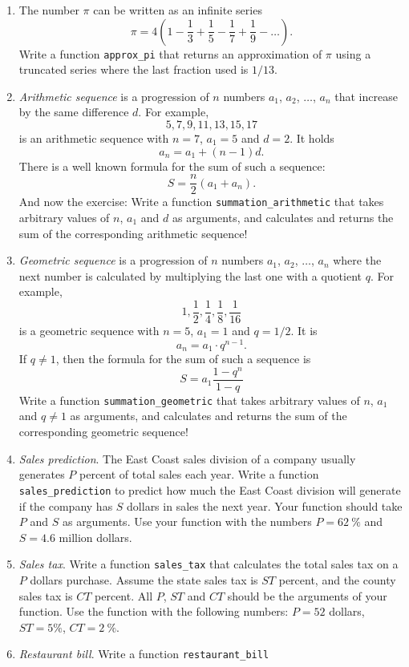 \begin{enumerate}
\item The number $\pi$ can be written as an infinite series 
$$
\pi = 4\left(1 - \frac{1}{3} + \frac{1}{5} - \frac{1}{7} + \frac{1}{9} - \ldots     \right).
$$
Write a function {\tt approx\_pi} that returns an approximation of $\pi$ using a truncated 
series where the last fraction used is $1/13$.
\item {\em Arithmetic sequence} is a progression of $n$ numbers $a_1$, $a_2$, $\ldots$, $a_n$
that increase by the same difference $d$. For example, 
$$
5, 7, 9, 11, 13, 15, 17
$$
is an arithmetic sequence with $n = 7$, $a_1 = 5$ and $d = 2$. It holds
$$
a_n = a_1 + (n-1)d.
$$
There is a well known formula for the sum of such a sequence:
$$
S = \frac{n}{2}(a_1 + a_n).
$$
And now the exercise: Write a function {\tt summation\_arithmetic} that takes arbitrary 
values of $n$, $a_1$ and $d$ as arguments, and calculates and returns the sum
of the corresponding arithmetic sequence! 
\item {\em Geometric sequence} is a progression of $n$ numbers $a_1$, $a_2$, $\ldots$, $a_n$
where the next number is calculated by multiplying the last one with a quotient $q$.
For example, 
$$
1, \frac{1}{2}, \frac{1}{4}, \frac{1}{8}, \frac{1}{16}
$$
is a geometric sequence with $n = 5$, $a_1 = 1$ and $q = 1/2$. It is 
$$
a_n = a_1 \cdot q^{n-1}.
$$
If $q \not = 1$, then the formula for the sum of such a sequence is
$$
S = a_1\frac{1 - q^n}{1 - q}
$$
Write a function {\tt summation\_geometric} that takes arbitrary 
values of $n$, $a_1$ and $q \not = 1$ as arguments, and calculates 
and returns the sum of the corresponding geometric sequence! 
\item {\em Sales prediction}. The East Coast sales division of a company usually generates $P$
percent of total sales each year. Write a function {\tt sales\_prediction} to predict how much 
the East Coast division will generate if the company has $S$ dollars in sales the next year. 
Your function should take $P$ and $S$ as arguments. Use
your function with the numbers $P = 62\ \%$ and $S = 4.6$ million dollars. 
\item {\em Sales tax}. 
Write a function {\tt sales\_tax} that calculates the total sales tax on a $P$ dollars purchase. 
Assume the state sales tax is $ST$ percent, and the county sales tax is $CT$ percent. All $P$, $ST$ and 
$CT$ should be the arguments of your function. Use the
function with the following numbers: $P = 52$ dollars, $ST = 5 \%$, $CT = 2 \ \%$.
\item {\em Restaurant bill}. Write a function {\tt restaurant\_bill} 

\end{enumerate}
